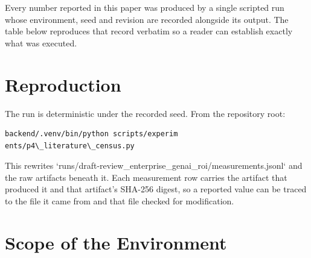 \documentclass[10pt,journal,compsoc,twocolumn]{IEEEtran}
\begin{document}
Every number reported in this paper was produced by a single scripted run whose environment, seed and revision are recorded alongside its output. The table below reproduces that record verbatim so a reader can establish exactly what was executed.
\begin{table}[htbp]
\centering
{}
\end{table}


\section{Reproduction}


The run is deterministic under the recorded seed. From the repository root:


\begin{scriptsize}
\begin{verbatim}
backend/.venv/bin/python scripts/experim
ents/p4\_literature\_census.py
\end{verbatim}
\end{scriptsize}


This rewrites `runs/draft-review\_enterprise\_genai\_roi/measurements.jsonl` and the raw artifacts beneath it. Each measurement row carries the artifact that produced it and that artifact's SHA-256 digest, so a reported value can be traced to the file it came from and that file checked for modification.


\section{Scope of the Environment}
\end{document}
